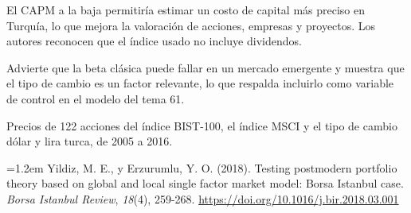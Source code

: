 \documentclass{article}
\newcommand{\cardtitlesize}{\fontsize{31.9}{38.3}\selectfont}
\newcommand{\smallsize}{\fontsize{22.1}{28.7}\selectfont}
\newcommand{\cardtitle}[2][navy]{{\color{#1}\cardtitlesize\bfseries\textls[110]{\MakeUppercase{#2}}}\par\vspace{7mm}}
\begin{document}
\vfill
\hspace*{34mm}\begin{minipage}{773mm}
\begin{tcbraster}[raster columns=3, raster equal height, raster column skip=16mm]
\begin{tcolorbox}[card, raster multicolumn=2]\cardtitle{Conclusiones}El CAPM a la baja permitiría estimar un costo de capital más preciso en Turquía, lo que mejora la valoración de acciones, empresas y proyectos. Los autores reconocen que el índice usado no incluye dividendos.\end{tcolorbox}
\begin{tcolorbox}[card=gold, colback=goldSoft]\cardtitle{Aporte al tema 61}Advierte que la beta clásica puede fallar en un mercado emergente y muestra que el tipo de cambio es un factor relevante, lo que respalda incluirlo como variable de control en el modelo del tema 61.\end{tcolorbox}
\end{tcbraster}
\end{minipage}

\vfill
\begin{tcolorbox}[enhanced, sharp corners, colback=navy, boxrule=0pt, width=\paperwidth,
  left=34mm, right=34mm, top=14mm, bottom=11mm,
  overlay={\fill[gold] (frame.north west) rectangle ([yshift=-5mm]frame.north east);}]
\begin{minipage}[c]{245mm}\raggedright
{\color{acento}\smallsize\bfseries{}}\par\vspace{5mm}
{\color{white}\smallsize Precios de 122 acciones del índice BIST-100, el índice MSCI y el tipo de cambio dólar y lira turca, de 2005 a 2016.}
\end{minipage}\hfill
\begin{minipage}[c]{385mm}\raggedright
{\color{acento}\smallsize\bfseries{}}\par\vspace{5mm}
{\color{white}\smallsize\hangindent=1.2em Yildiz, M. E., y Erzurumlu, Y. O. (2018). Testing postmodern portfolio theory based on global and local single factor market model: Borsa Istanbul case. \textit{Borsa Istanbul Review}, \textit{18}(4), 259-268. \url{https://doi.org/10.1016/j.bir.2018.03.001}\par}
\end{minipage}\hfill
\begin{minipage}[c]{100mm}\centering
{}\par\vspace{4mm}
{\color{acento}\fontsize{17}{21}\selectfont\bfseries{}}
\end{minipage}
\end{tcolorbox}
\end{document}
